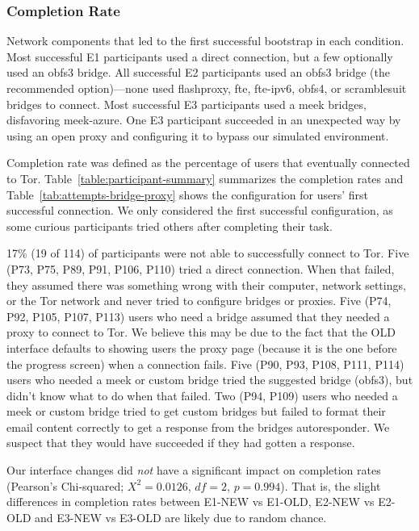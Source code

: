 \documentclass[USenglish,oneside,twocolumn]{article}
\begin{document}
\subsubsection{Completion Rate} 

\begin{table}[t]
\centering

\caption{
Network components that led to the first successful bootstrap
in each condition.
Most successful E1 participants used a direct connection,
but a few optionally used an obfs3 bridge.
All successful E2 participants used 
an obfs3 bridge (the recommended option)---none used 
flashproxy, fte, fte-ipv6, obfs4, or scramblesuit bridges to connect. 
Most successful E3 participants
used a meek bridges, disfavoring meek-azure.
One E3 participant succeeded in an unexpected way
by using an open proxy and configuring it to bypass our 
simulated environment.
}
\label{tab:attempts-bridge-proxy}
\end{table}

Completion rate was defined as the percentage of users that eventually connected to Tor. Table~\ref{table:participant-summary} summarizes the completion rates and Table~\ref{tab:attempts-bridge-proxy} shows the configuration for users' first successful connection. We only considered the first successful configuration, as some curious participants tried others after completing their task. 

17\% (19 of 114) of participants were not able to successfully connect to Tor. Five (P73, P75, P89, P91, P106, P110) tried a direct connection. When that failed, they assumed there was something wrong with their computer, network settings, or the Tor network and never tried to configure bridges or proxies. Five (P74, P92, P105, P107, P113) users who need a bridge assumed that they needed a proxy to connect to Tor. We believe this may be due to the fact that the OLD interface defaults to showing users the proxy page (because it is the one before the progress screen) when a connection fails. Five (P90, P93, P108, P111, P114) users who needed a meek or custom bridge tried the suggested bridge (obfs3), but didn't know what to do when that failed. Two (P94, P109) users who needed a meek or custom bridge tried to get custom bridges but failed to format their email content correctly to get a response from the bridges autoresponder. We suspect that they would have succeeded if they had gotten a response. 

Our interface changes did {\it not} have a significant impact on completion rates (Pearson's Chi-squared; $X^2 = 0.0126$, $df = 2$, $p = 0.994$). That is, the slight differences in completion rates between E1-NEW vs E1-OLD, E2-NEW vs E2-OLD and E3-NEW vs E3-OLD are likely due to random chance.
\end{document}
